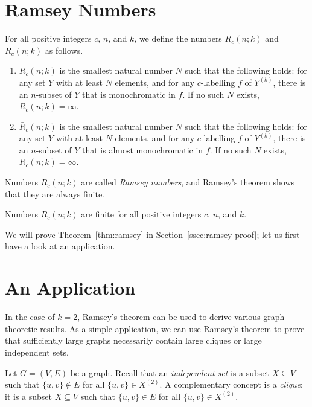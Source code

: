 \section{Ramsey Numbers}

For all positive integers $c$, $n$, and $k$, we define the numbers $R_c(n;k)$ and $\bar{R}_c(n;k)$ as follows.
\begin{enumerate}
    \item $R_c(n;k)$ is the smallest natural number $N$ such that the following holds: for any set $Y$ with at least $N$ elements, and for any $c$-labelling $f$ of $Y^{(k)}$, there is an $n$-subset of $Y$ that is monochromatic in $f$. If no such $N$ exists, $R_c(n;k) = \infty$.
    \item $\bar{R}_c(n;k)$ is the smallest natural number $N$ such that the following holds: for any set $Y$ with at least $N$ elements, and for any $c$-labelling $f$ of $Y^{(k)}$, there is an $n$-subset of $Y$ that is almost monochromatic in $f$. If no such $N$ exists, $\bar{R}_c(n;k) = \infty$.
\end{enumerate}
Numbers $R_c(n;k)$ are called \emph{Ramsey numbers}, and Ramsey's theorem shows that they are always finite.

\begin{theorem}\label{thm:ramsey}
    Numbers $R_c(n;k)$ are finite for all positive integers $c$, $n$, and $k$.
\end{theorem}

We will prove Theorem~\ref{thm:ramsey} in Section~\ref{ssec:ramsey-proof}; let us first have a look at an application.


\section{An Application}

In the case of $k = 2$, Ramsey's theorem can be used to derive various graph-theoretic results. As a simple application, we can use Ramsey's theorem to prove that sufficiently large graphs necessarily contain large cliques or large independent sets.

Let $G = (V,E)$ be a graph. Recall that an \emph{independent set} is a subset $X \subseteq V$ such that $\{u,v\} \notin E$ for all $\{u, v\} \in X^{(2)}$. A complementary concept is a \emph{clique}: it is a subset $X \subseteq V$ such that $\{u,v\} \in E$ for all $\{u, v\} \in X^{(2)}$.

